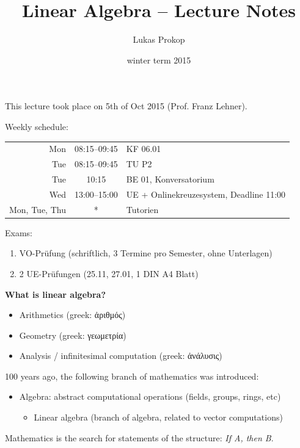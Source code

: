 \documentclass[a4paper,landscape,twocolumn]{article}
\title{Linear Algebra -- Lecture Notes}
\author{Lukas Prokop}
\date{winter term 2015}
\newcommand\meta[3]{This #1 took place on #2 (#3).\par}
\newcommand{\textgreek}[1]{\begingroup\fontencoding{LGR}\selectfont#1\endgroup}
\begin{document}
\maketitle
\tableofcontents

\clearpage
\meta{lecture}{5th of Oct 2015}{Prof. Franz Lehner}

Weekly schedule:

\begin{table}[!ht]
  \begin{tabular}{rcl}
    \hline \hline
    Mon & 08:15--09:45 & KF 06.01 \\
    Tue & 08:15--09:45 & TU P2 \\
    Tue & 10:15 & BE 01, Konversatorium \\
    Wed & 13:00--15:00 & UE + Onlinekreuzesystem, Deadline 11:00 \\
    Mon, Tue, Thu & * & Tutorien \\
    \hline \hline
  \end{tabular}
\end{table}

Exams:
\begin{enumerate}
  \item VO-Prüfung (schriftlich, 3 Termine pro Semester, ohne Unterlagen)
  \item 2 UE-Prüfungen (25.11, 27.01, 1 DIN A4 Blatt)
\end{enumerate}

\textbf{What is linear algebra?}
\begin{itemize}
  \item Arithmetics (greek: \textgreek{ἀριθμός})
  \item Geometry (greek: \textgreek{γεωμετρία})
  \item Analysis / infinitesimal computation (greek: \textgreek{ἀνάλυσις})
\end{itemize}

100 years ago, the following branch of mathematics was introduced:
\begin{itemize}
  \item Algebra: abstract computational operations (fields, groups, rings, etc)
  \begin{itemize}
    \item Linear algebra (branch of algebra, related to vector computations)
  \end{itemize}
\end{itemize}

Mathematics is the search for statements of the structure: \emph{If A, then B}.
\end{document}
